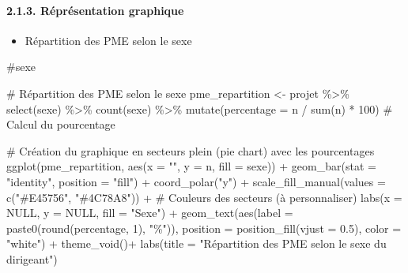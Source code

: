 \documentclass[
  letterpaper,
  DIV=11,
  numbers=noendperiod]{scrartcl}
\let\oldparagraph\paragraph
\renewcommand{\paragraph}[1]{\oldparagraph{#1}\mbox{}}
\newenvironment{Shaded}{\begin{snugshade}}{\end{snugshade}}
\newcommand{\AttributeTok}[1]{\textcolor[rgb]{0.40,0.45,0.13}{#1}}
\newcommand{\CommentTok}[1]{\textcolor[rgb]{0.37,0.37,0.37}{#1}}
\newcommand{\ConstantTok}[1]{\textcolor[rgb]{0.56,0.35,0.01}{#1}}
\newcommand{\DecValTok}[1]{\textcolor[rgb]{0.68,0.00,0.00}{#1}}
\newcommand{\FloatTok}[1]{\textcolor[rgb]{0.68,0.00,0.00}{#1}}
\newcommand{\FunctionTok}[1]{\textcolor[rgb]{0.28,0.35,0.67}{#1}}
\newcommand{\NormalTok}[1]{\textcolor[rgb]{0.00,0.23,0.31}{#1}}
\newcommand{\OtherTok}[1]{\textcolor[rgb]{0.00,0.23,0.31}{#1}}
\newcommand{\SpecialCharTok}[1]{\textcolor[rgb]{0.37,0.37,0.37}{#1}}
\newcommand{\StringTok}[1]{\textcolor[rgb]{0.13,0.47,0.30}{#1}}
\providecommand{\tightlist}{%
  \setlength{\itemsep}{0pt}\setlength{\parskip}{0pt}}\usepackage{longtable,booktabs,array}
\begin{document}
\hypertarget{ruxe9pruxe9sentation-graphique}{%
\paragraph{2.1.3. Réprésentation
graphique}\label{ruxe9pruxe9sentation-graphique}}

\begin{itemize}
\tightlist
\item
  Répartition des PME selon le sexe
\end{itemize}

\begin{Shaded}
\begin{Highlighting}[]
\CommentTok{\#sexe}

\CommentTok{\# Répartition des PME selon le sexe}
\NormalTok{pme\_repartition }\OtherTok{\textless{}{-}}\NormalTok{ projet }\SpecialCharTok{\%\textgreater{}\%}
  \FunctionTok{select}\NormalTok{(sexe) }\SpecialCharTok{\%\textgreater{}\%}
  \FunctionTok{count}\NormalTok{(sexe) }\SpecialCharTok{\%\textgreater{}\%}
  \FunctionTok{mutate}\NormalTok{(}\AttributeTok{percentage =}\NormalTok{ n }\SpecialCharTok{/} \FunctionTok{sum}\NormalTok{(n) }\SpecialCharTok{*} \DecValTok{100}\NormalTok{)  }\CommentTok{\# Calcul du pourcentage}

\CommentTok{\# Création du graphique en secteurs plein (pie chart) avec les pourcentages}
\FunctionTok{ggplot}\NormalTok{(pme\_repartition, }\FunctionTok{aes}\NormalTok{(}\AttributeTok{x =} \StringTok{""}\NormalTok{, }\AttributeTok{y =}\NormalTok{ n, }\AttributeTok{fill =}\NormalTok{ sexe)) }\SpecialCharTok{+}
  \FunctionTok{geom\_bar}\NormalTok{(}\AttributeTok{stat =} \StringTok{"identity"}\NormalTok{, }\AttributeTok{position =} \StringTok{"fill"}\NormalTok{) }\SpecialCharTok{+}
  \FunctionTok{coord\_polar}\NormalTok{(}\StringTok{"y"}\NormalTok{) }\SpecialCharTok{+}
  \FunctionTok{scale\_fill\_manual}\NormalTok{(}\AttributeTok{values =} \FunctionTok{c}\NormalTok{(}\StringTok{"\#E45756"}\NormalTok{, }\StringTok{"\#4C78A8"}\NormalTok{)) }\SpecialCharTok{+}  \CommentTok{\# Couleurs des secteurs (à personnaliser)}
  \FunctionTok{labs}\NormalTok{(}\AttributeTok{x =} \ConstantTok{NULL}\NormalTok{, }\AttributeTok{y =} \ConstantTok{NULL}\NormalTok{, }\AttributeTok{fill =} \StringTok{"Sexe"}\NormalTok{) }\SpecialCharTok{+}
  \FunctionTok{geom\_text}\NormalTok{(}\FunctionTok{aes}\NormalTok{(}\AttributeTok{label =} \FunctionTok{paste0}\NormalTok{(}\FunctionTok{round}\NormalTok{(percentage, }\DecValTok{1}\NormalTok{), }\StringTok{"\%"}\NormalTok{)), }\AttributeTok{position =} \FunctionTok{position\_fill}\NormalTok{(}\AttributeTok{vjust =} \FloatTok{0.5}\NormalTok{), }\AttributeTok{color =} \StringTok{"white"}\NormalTok{) }\SpecialCharTok{+}
  \FunctionTok{theme\_void}\NormalTok{()}\SpecialCharTok{+}
  \FunctionTok{labs}\NormalTok{(}\AttributeTok{title =} \StringTok{"Répartition des PME selon le sexe du dirigeant"}\NormalTok{)}
\end{Highlighting}
\end{Shaded}
\end{document}
